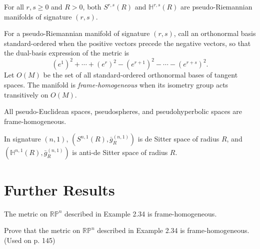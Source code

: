 \begin{theorem}
\label{thm:pseudo-riemannian-signature}
For all $r,s\geq0$ and $R>0$, both $S^{r,s}(R)$ and
$\mathbb H^{r,s}(R)$ are pseudo-Riemannian manifolds of signature $(r,s)$.
\end{theorem}

For a pseudo-Riemannian manifold of signature $(r,s)$, call an orthonormal basis
standard-ordered when the positive vectors precede the negative vectors, so that
the dual-basis expression of the metric is
\[
(e^1)^2+\cdots+(e^r)^2-(e^{r+1})^2-\cdots-(e^{r+s})^2.
\]
Let $O(M)$ be the set of all standard-ordered orthonormal bases of tangent spaces.
The manifold is \emph{frame-homogeneous} when its isometry group acts transitively
on $O(M)$.

\begin{theorem}
\label{thm:frame-homogeneous-pseudo-riemannian}
All pseudo-Euclidean spaces, pseudospheres, and pseudohyperbolic spaces are
frame-homogeneous.
\end{theorem}

In signature $(n,1)$, $(S^{n,1}(R),\bar g_R^{(n,1)})$ is de Sitter space of
radius $R$, and $(\mathbb H^{n,1}(R),\bar g_R^{(n,1)})$ is anti-de Sitter space
of radius $R$.

\section{Further Results}

\begin{proposition}
\label{prop:rp-n-frame-homogeneous}
The metric on $\mathbb{RP}^n$ described in Example 2.34 is frame-homogeneous.
\end{proposition}

\begin{exercise}\label{prob:rp-n-frame-homogeneous}
Prove that the metric on $\mathbb{RP}^n$ described in Example 2.34 is frame-homogeneous. (Used on p. 145)
\end{exercise}


